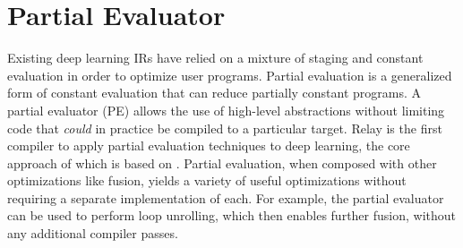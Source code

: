 
\section{Partial Evaluator}
\label{sec:partial_eval}
Existing deep learning IRs have relied on
  a mixture of staging and constant evaluation
  in order to optimize user programs.
Partial evaluation is a generalized form of constant
  evaluation that can reduce partially constant
  programs.
A partial evaluator (PE) allows the use of high-level abstractions
  without limiting code that \textit{could} in practice be
  compiled to a particular target.
Relay is the first compiler to apply partial evaluation
  techniques to deep learning, the
  core approach of which is based on \citep{pe_ref}.
Partial evaluation, when composed with other
  optimizations like fusion, yields a variety
  of useful optimizations without requiring
  a separate implementation of each.
For example, the partial evaluator can be used to perform
  loop unrolling, which then enables further fusion,
  without any additional compiler passes.

